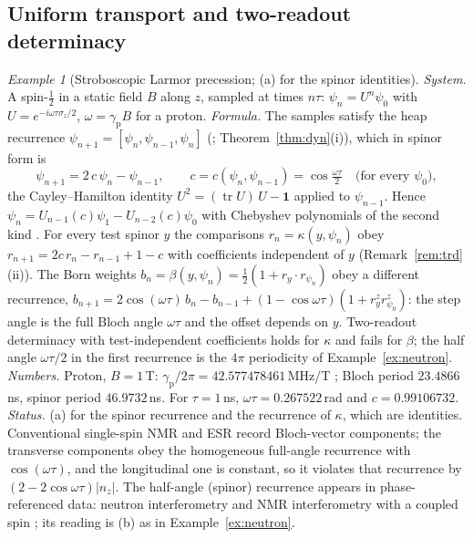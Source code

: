\documentclass[aps,pra,onecolumn,superscriptaddress,nofootinbib,10pt]{revtex4-2}
\theoremstyle{definition}
\theoremstyle{remark}
\newtheorem{example}[theorem]{Example}
\newcommand{\hp}[3]{[#1,#2,#3]}
\begin{document}
\subsection{Uniform transport and two-readout determinacy}

\begin{example}[Stroboscopic Larmor precession; (a) for the spinor identities]\label{ex:larmor}
\emph{System.}  A spin-$\tfrac12$ in a static field $B$ along $z$, sampled at times $n\tau$: $\psi_n=U^n\psi_0$ with
$U=e^{-i\omega\tau\sigma_z/2}$, $\omega=\gamma_{\mathrm p}B$ for a proton.
\emph{Formula.}  The samples satisfy the heap recurrence $\psi_{n+1}=\hp{\psi_n}{\psi_{n-1}}{\psi_n}$ (\cite[Thm.~6.2]{PaperI};
Theorem~\ref{thm:dyn}(i)), which in spinor form is
\[
\psi_{n+1}=2\,c\,\psi_n-\psi_{n-1},\qquad c=c(\psi_n,\psi_{n-1})=\cos\tfrac{\omega\tau}2\quad\text{(for every }\psi_0),
\]
the Cayley--Hamilton identity $U^2=(\operatorname{tr}U)\,U-\mathbf 1$ applied to $\psi_{n-1}$.  Hence
$\psi_n=U_{n-1}(c)\psi_1-U_{n-2}(c)\psi_0$ with Chebyshev polynomials of the second kind \cite[Thm.~6.2]{PaperI}.  For every test
spinor $y$ the comparisons $r_n=\kappa(y,\psi_n)$ obey $r_{n+1}=2c\,r_n-r_{n-1}+1-c$ with coefficients
independent of $y$ (Remark~\ref{rem:trd}(ii)).  The Born weights $b_n=\beta(y,\psi_n)=\tfrac12(1+r_y\cdot r_{\psi_n})$
obey a different recurrence, $b_{n+1}=2\cos(\omega\tau)\,b_n-b_{n-1}+(1-\cos\omega\tau)(1+r_y^z r_{\psi_0}^z)$: the
step angle is the full Bloch angle $\omega\tau$ and the offset depends on $y$.  Two-readout determinacy
with test-independent coefficients holds for $\kappa$ and fails for $\beta$; the half angle $\omega\tau/2$ in the
first recurrence is the $4\pi$ periodicity of Example~\ref{ex:neutron}.
\emph{Numbers.}  Proton, $B=1$\,T: $\gamma_{\mathrm p}/2\pi=42.577478461$\,MHz/T \cite{ex-CODATA22}; Bloch period
$23.4866$\,ns, spinor period $46.9732$\,ns.  For $\tau=1$\,ns, $\omega\tau=0.267522$\,rad and $c=0.99106732$.
\emph{Status.}  (a) for the spinor recurrence and the recurrence of $\kappa$, which are identities.  Conventional
single-spin NMR and ESR record Bloch-vector components; the transverse components obey the homogeneous
full-angle recurrence with $\cos(\omega\tau)$, and the longitudinal one is constant, so it violates that
recurrence by $(2-2\cos\omega\tau)\lvert n_z\rvert$.  The half-angle (spinor) recurrence appears in phase-referenced
data: neutron interferometry and NMR interferometry with a coupled spin \cite{ex-SVV77}; its reading is
(b) as in Example~\ref{ex:neutron}.
\end{example}
\end{document}
